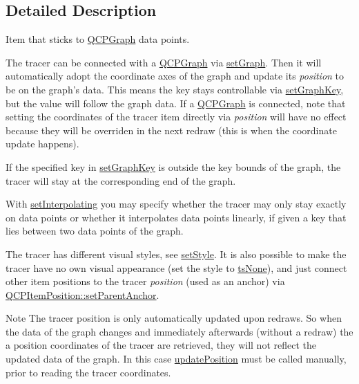 \subsection{\-Detailed \-Description}
\-Item that sticks to \hyperlink{classQCPGraph}{\-Q\-C\-P\-Graph} data points. 

 \-The tracer can be connected with a \hyperlink{classQCPGraph}{\-Q\-C\-P\-Graph} via \hyperlink{classQCPItemTracer_af5886f4ded8dd68cb4f3388f390790c0}{set\-Graph}. \-Then it will automatically adopt the coordinate axes of the graph and update its {\itshape position\/} to be on the graph's data. \-This means the key stays controllable via \hyperlink{classQCPItemTracer_a6840143b42f3b685cedf7c6d83a704c8}{set\-Graph\-Key}, but the value will follow the graph data. \-If a \hyperlink{classQCPGraph}{\-Q\-C\-P\-Graph} is connected, note that setting the coordinates of the tracer item directly via {\itshape position\/} will have no effect because they will be overriden in the next redraw (this is when the coordinate update happens).

\-If the specified key in \hyperlink{classQCPItemTracer_a6840143b42f3b685cedf7c6d83a704c8}{set\-Graph\-Key} is outside the key bounds of the graph, the tracer will stay at the corresponding end of the graph.

\-With \hyperlink{classQCPItemTracer_a6c244a9d1175bef12b50afafd4f5fcd2}{set\-Interpolating} you may specify whether the tracer may only stay exactly on data points or whether it interpolates data points linearly, if given a key that lies between two data points of the graph.

\-The tracer has different visual styles, see \hyperlink{classQCPItemTracer_a41a2ac4f1acd7897b4e2a2579c03204e}{set\-Style}. \-It is also possible to make the tracer have no own visual appearance (set the style to \hyperlink{classQCPItemTracer_a2f05ddb13978036f902ca3ab47076500aac27462c79146225bfa8fba24d2ee8a4}{ts\-None}), and just connect other item positions to the tracer {\itshape position\/} (used as an anchor) via \hyperlink{classQCPItemPosition_ac094d67a95d2dceafa0d50b9db3a7e51}{\-Q\-C\-P\-Item\-Position\-::set\-Parent\-Anchor}.

\begin{DoxyNote}{\-Note}
\-The tracer position is only automatically updated upon redraws. \-So when the data of the graph changes and immediately afterwards (without a redraw) the a position coordinates of the tracer are retrieved, they will not reflect the updated data of the graph. \-In this case \hyperlink{classQCPItemTracer_a5b90296109e36384aedbc8908a670413}{update\-Position} must be called manually, prior to reading the tracer coordinates. 
\end{DoxyNote}


